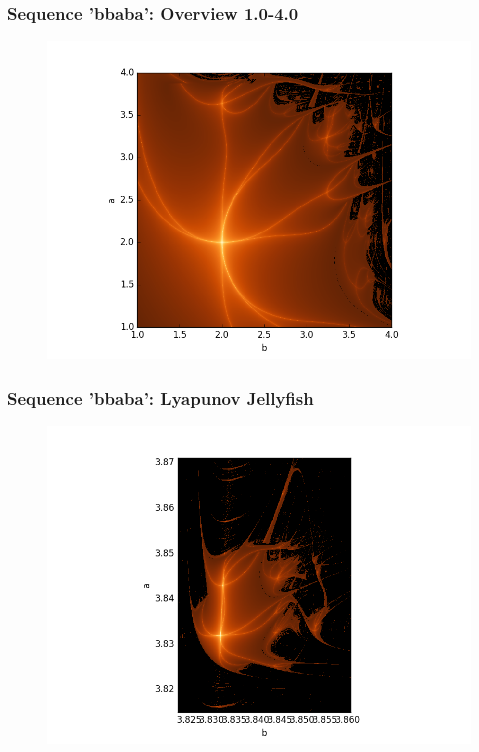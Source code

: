 \documentclass[ignorenonframetext]{beamer}
\begin{document}
\begin{frame}
\frametitle{Sequence 'bbaba': Overview 1.0-4.0}
\begin{figure}[htbp]
\includegraphics[scale = 0.5]{pictures/Overview_bbaba.png}
\end{figure}
\end{frame}

\begin{frame}
\frametitle{Sequence 'bbaba': Lyapunov Jellyfish}
\begin{figure}[htbp]
\includegraphics[scale = 0.5]{pictures/bbaba_jellyfish.png}
\end{figure}
\end{frame}
\end{document}
